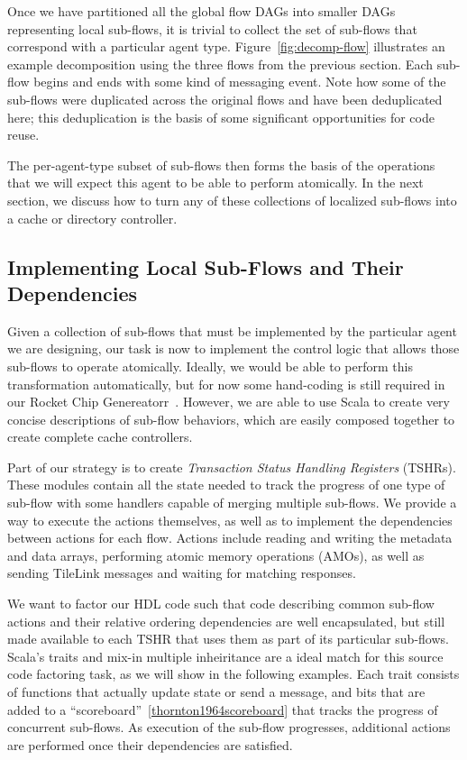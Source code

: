 Once we have partitioned all the global flow DAGs into smaller DAGs representing local sub-flows,
it is trivial to collect the set of sub-flows that correspond with a particular agent type.
Figure~\ref{fig:decomp-flow} illustrates an example decomposition using the three flows from the previous section.
Each sub-flow begins and ends with some kind of messaging event.
Note how some of the sub-flows were duplicated across the original flows and have been deduplicated here;
this deduplication is the basis of some significant opportunities for code reuse.

The per-agent-type subset of sub-flows then forms the basis of the operations that we will expect this agent to be able to perform atomically.
In the next section, we discuss how to turn any of these collections of localized sub-flows into a cache or directory controller.

\subsection{Implementing Local Sub-Flows and Their Dependencies}

Given a collection of sub-flows that must be implemented by the particular agent we are designing,
our task is now to implement the control logic that allows those sub-flows to operate atomically.
Ideally, we would be able to perform this transformation automatically, 
but for now some hand-coding is still required in our Rocket Chip Genereatorr~\cite{rocket}.
However, we are able to use Scala to create very concise descriptions of sub-flow behaviors,
which are easily composed together to create complete cache controllers.

Part of our strategy is to create \emph{Transaction Status Handling Registers} (TSHRs).
These modules contain all the state needed to track the progress of 
one type of sub-flow with some handlers capable of merging multiple sub-flows.
We provide a way to execute the actions themselves, as well as to implement the dependencies between actions for each flow.
Actions include reading and writing the metadata and data arrays,
performing atomic memory operations (AMOs),
as well as sending TileLink messages and waiting for matching responses.

We want to factor our HDL code such that code describing common sub-flow actions and their relative ordering dependencies
are well encapsulated, but still made available to each TSHR that uses them as part of its particular sub-flows.
Scala's traits and mix-in multiple inheiritance are a ideal match for this source code factoring task,
as we will show in the following examples.
Each trait consists of functions that actually update state or send a message,
and bits that are added to a ``scoreboard''~\ref{thornton1964scoreboard} that tracks the progress of concurrent sub-flows.
As execution of the sub-flow progresses, additional actions are performed once their dependencies are satisfied.

